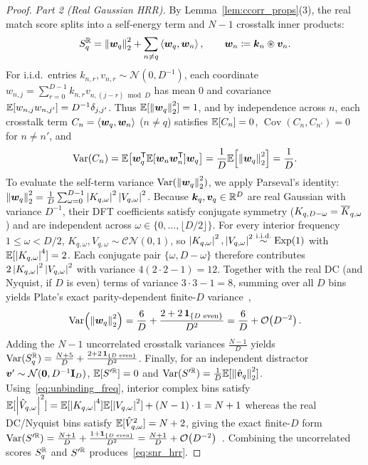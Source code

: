 \begin{proof}
\medskip
\noindent\emph{Part 2 (Real Gaussian HRR).}
By Lemma~\ref{lem:ccorr_props}(3), the real match score splits into a self-energy term and $N-1$ crosstalk inner products:
\begin{equation*}
    S_q^{\mathbb{R}} = \left\lVert \boldsymbol{w}_q \right\rVert_2^2 + \sum_{n \neq q} \left\langle \boldsymbol{w}_q, \boldsymbol{w}_n \right\rangle,
    \qquad \boldsymbol{w}_n \coloneqq \boldsymbol{k}_n \circledast \boldsymbol{v}_n.
\end{equation*}
For i.i.d.\ entries $k_{n,r}, v_{n,r} \sim \mathcal{N}(0, D^{-1})$, each coordinate $w_{n,j} = \sum_{r=0}^{D-1} k_{n,r} v_{n,(j-r)\bmod D}$ has mean $0$ and covariance $\mathbb{E}[w_{n,j} w_{n,j'}] = D^{-1}\delta_{j,j'}$.
Thus $\mathbb{E}[\left\lVert \boldsymbol{w}_q \right\rVert_2^2] = 1$, and by independence across $n$, each crosstalk term $C_n = \left\langle \boldsymbol{w}_q, \boldsymbol{w}_n \right\rangle$ ($n \neq q$) satisfies $\mathbb{E}[C_n] = 0$, $\operatorname{Cov}(C_n, C_{n'}) = 0$ for $n \neq n'$, and
\begin{equation*}
    \operatorname{Var}(C_n) = \mathbb{E}\!\left[\boldsymbol{w}_q^{\mathsf{T}} \mathbb{E}[\boldsymbol{w}_n \boldsymbol{w}_n^{\mathsf{T}}] \boldsymbol{w}_q\right]
    = \frac{1}{D}\mathbb{E}\!\left[\left\lVert \boldsymbol{w}_q \right\rVert_2^2\right] = \frac{1}{D}.
\end{equation*}
To evaluate the self-term variance $\operatorname{Var}(\left\lVert \boldsymbol{w}_q \right\rVert_2^2)$, we apply Parseval's identity: $\left\lVert \boldsymbol{w}_q \right\rVert_2^2 = \frac{1}{D}\sum_{\omega=0}^{D-1} \left\lvert K_{q,\omega} \right\rvert^2 \left\lvert V_{q,\omega} \right\rvert^2$.
Because $\boldsymbol{k}_q, \boldsymbol{v}_q \in \mathbb{R}^D$ are real Gaussian with variance $D^{-1}$, their DFT coefficients satisfy conjugate symmetry ($K_{q,D-\omega} = \overline{K}_{q,\omega}$) and are independent across $\omega \in \{0, \dots, \lfloor D/2 \rfloor\}$.
For every interior frequency $1 \le \omega < D/2$, $K_{q,\omega}, V_{q,\omega} \sim \mathcal{CN}(0, 1)$, so $\left\lvert K_{q,\omega} \right\rvert^2, \left\lvert V_{q,\omega} \right\rvert^2 \overset{\text{i.i.d.}}{\sim} \mathrm{Exp}(1)$ with $\mathbb{E}[\left\lvert K_{q,\omega} \right\rvert^4] = 2$.
Each conjugate pair $\{\omega, D-\omega\}$ therefore contributes $2\left\lvert K_{q,\omega} \right\rvert^2\left\lvert V_{q,\omega} \right\rvert^2$ with variance $4(2\cdot 2 - 1) = 12$.
Together with the real DC (and Nyquist, if $D$ is even) terms of variance $3\cdot 3 - 1 = 8$, summing over all $D$ bins yields Plate's exact parity-dependent finite-$D$ variance~\cite{PLATE_1995_HRR},
\begin{equation*}
    \operatorname{Var}\!\left(\left\lVert \boldsymbol{w}_q \right\rVert_2^2\right) = \frac{6}{D} + \frac{2 + 2\,\mathbf{1}_{\{D\text{ even}\}}}{D^2} = \frac{6}{D} + \mathcal{O}\!\left(D^{-2}\right).
\end{equation*}
Adding the $N-1$ uncorrelated crosstalk variances $\frac{N-1}{D}$ yields $\operatorname{Var}(S_q^{\mathbb{R}}) = \frac{N + 5}{D} + \frac{2 + 2\,\mathbf{1}_{\{D\text{ even}\}}}{D^2}$.
Finally, for an independent distractor $\boldsymbol{v}' \sim \mathcal{N}(\boldsymbol{0}, D^{-1}\mathbf{I}_D)$, $\mathbb{E}[S'^{\mathbb{R}}] = 0$ and $\operatorname{Var}(S'^{\mathbb{R}}) = \frac{1}{D}\mathbb{E}[\left\lVert \hat{\boldsymbol{v}}_q \right\rVert_2^2]$.
Using~\eqref{eq:unbinding_freq}, interior complex bins satisfy $\mathbb{E}[\left\lvert \hat{V}_{q,\omega} \right\rvert^2] = \mathbb{E}[\left\lvert K_{q,\omega} \right\rvert^4]\mathbb{E}[\left\lvert V_{q,\omega} \right\rvert^2] + (N-1)\cdot 1 = N + 1$ whereas the real DC/Nyquist bins satisfy $\mathbb{E}[\hat{V}_{q,\omega}^2] = N + 2$, giving the exact finite-$D$ form $\operatorname{Var}(S'^{\mathbb{R}}) = \frac{N+1}{D} + \frac{1 + \mathbf{1}_{\{D\text{ even}\}}}{D^2} = \frac{N+1}{D} + \mathcal{O}\!\left(D^{-2}\right)$~\cite{PLATE_1995_HRR}.
Combining the uncorrelated scores $S_q^{\mathbb{R}}$ and $S'^{\mathbb{R}}$ produces~\eqref{eq:snr_hrr}.
\end{proof}

